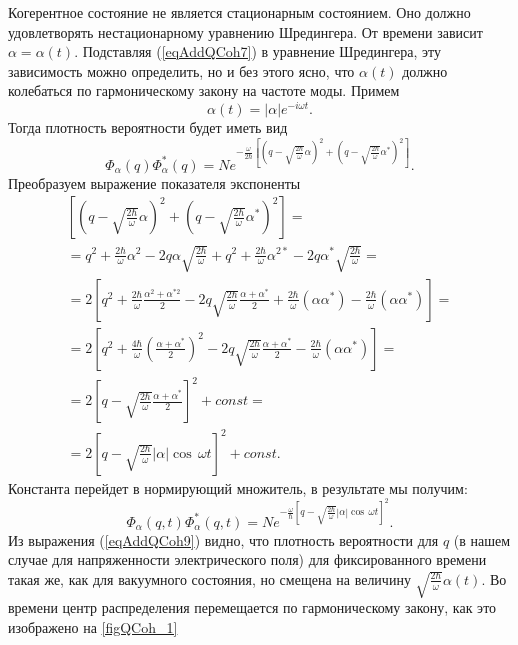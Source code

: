 Когерентное состояние не является стационарным состоянием. Оно должно
удовлетворять нестационарному уравнению Шредингера. От времени зависит
$\alpha = \alpha\left(t\right)$. Подставляя (\ref{eqAddQCoh7}) в
уравнение Шредингера, эту зависимость можно определить, но и без этого
ясно, что $\alpha\left(t\right)$ должно колебаться по гармоническому
закону на частоте моды. Примем 
\[
\alpha\left(t\right) = \left|\alpha\right| e^{-i \omega t}.
\]
Тогда плотность вероятности будет иметь вид
\begin{equation}
\Phi_{\alpha}\left(q\right)\Phi_{\alpha}^{*}\left(q\right) = N e^{-\frac{\omega}{2
    \hbar}
\left[\left(q-\sqrt{\frac{2\hbar}{\omega}}\alpha\right)^2
+
\left(q-\sqrt{\frac{2\hbar}{\omega}}\alpha^{*}\right)^2
\right]
}.
\nonumber
\end{equation}
Преобразуем выражение показателя экспоненты
\begin{eqnarray}
\left[\left(q-\sqrt{\frac{2\hbar}{\omega}}\alpha\right)^2
+
\left(q-\sqrt{\frac{2\hbar}{\omega}}\alpha^{*}\right)^2
\right] = 
\nonumber \\
=
q^2 + \frac{2\hbar}{\omega}\alpha^2 - 2 q \alpha
  \sqrt{\frac{2\hbar}{\omega}} +
q^2 + \frac{2\hbar}{\omega}\alpha^{2 *} - 2 q \alpha^{*}
  \sqrt{\frac{2\hbar}{\omega}} =
\nonumber \\
= 2
\left[
q^2 + \frac{2\hbar}{\omega}\frac{\alpha^2 + \alpha^{*2}}{2} -
2 q \sqrt{\frac{2\hbar}{\omega}} \frac{\alpha + \alpha^{*}}{2} +
\frac{2 \hbar}{\omega}\left(\alpha\alpha^{*}\right) -
\frac{2 \hbar}{\omega}\left(\alpha\alpha^{*}\right)
\right] = 
\nonumber \\
= 2
\left[
q^2 + \frac{4\hbar}{\omega}\left(\frac{\alpha + \alpha^{*}}{2}\right)^2 -
2 q \sqrt{\frac{2\hbar}{\omega}} \frac{\alpha + \alpha^{*}}{2}  -
\frac{2 \hbar}{\omega}\left(\alpha\alpha^{*}\right)
\right] = 
\nonumber \\
= 2
\left[
q - \sqrt{\frac{2\hbar}{\omega}} \frac{\alpha + \alpha^{*}}{2}
\right]^2 + const = 
\nonumber \\
= 
2
\left[
q - \sqrt{\frac{2\hbar}{\omega}} \left|\alpha\right|\cos\,\omega t
\right]^2 + const.
\nonumber
\end{eqnarray}
Константа перейдет в нормирующий множитель, в результате мы получим:
\begin{equation}
\Phi_{\alpha}\left(q,t\right)\Phi_{\alpha}^{*}\left(q,t\right) = N
e^{-\frac{\omega}{\hbar}
\left[
q - \sqrt{\frac{2\hbar}{\omega}} \left|\alpha\right|\cos\,\omega t
\right]^2
}.
\label{eqAddQCoh9}
\end{equation}
Из выражения (\ref{eqAddQCoh9}) видно, что плотность вероятности для
$q$ (в нашем случае для напряженности электрического поля) для
фиксированного времени такая же, как для вакуумного состояния, но
смещена на величину
$\sqrt{\frac{2\hbar}{\omega}}\alpha\left(t\right)$. Во времени центр
распределения перемещается по гармоническому закону, как это
изображено на \autoref{figQCoh_1} 

